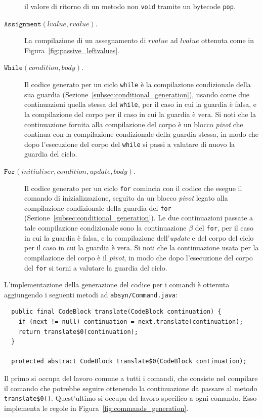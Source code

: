 \begin{description}
  il valore di ritorno di un metodo non \texttt{void} tramite un
  bytecode \texttt{pop}.
\item[\underline{$\mathtt{Assignment(\mathit{lvalue},\mathit{rvalue})}$}.]
  La compilazione di un assegnamento di $\mathit{rvalue}$ ad
  $\mathit{lvalue}$ \e ottenuta come in Figura~\ref{fig:passive_leftvalues}.
\item[\underline{$\mathtt{While(\mathit{condition},\mathit{body})}$}.]
  Il codice generato per un ciclo \texttt{while} \`e la compilazione
  condizionale della sua guardia (Sezione~\ref{subsec:conditional_generation}),
  usando come due continuazioni quella stessa del \texttt{while}, per
  il caso in cui la guardia \`e falsa, e la compilazione del
  corpo per il caso in cui la guardia \`e vera. Si noti che la
  continuazione fornita alla compilazione del corpo \`e un blocco
  \textit{pivot}
  che continua con la compilazione condizionale della guardia stessa,
  in modo che dopo l'esecuzione del corpo del \texttt{while} si passi
  a valutare di nuovo la guardia del ciclo.
\item[\underline{$\mathtt{For(\mathit{initialiser},\mathit{condition},
  \mathit{update},\mathit{body})}$}.]
  Il codice generato per un ciclo \texttt{for} comincia con il codice
  che esegue il comando di inizializzazione, seguito da un blocco
  \textit{pivot} legato alla compilazione condizionale della guardia
  del \texttt{for} (Sezione~\ref{subsec:conditional_generation}).
  Le due continuazioni passate a tale compilazione condizionale sono
  la continuazione $\beta$ del \texttt{for}, per il caso in cui la
  guardia \`e falsa, e la compilazione dell'\textit{update} e del corpo
  del ciclo per il caso in cui la guardia \`e vera. Si noti che la
  continuazione usata per la compilazione del corpo \`e il \textit{pivot},
  in modo che dopo l'esecuzione del corpo del \texttt{for} si torni a valutare
  la guardia del ciclo.
\end{description}

L'implementazione della generazione del codice per i comandi \`e ottenuta
aggiungendo i seguenti metodi ad \texttt{absyn/Command.java}:
%
\begin{verbatim}
  public final CodeBlock translate(CodeBlock continuation) {
    if (next != null) continuation = next.translate(continuation);
    return translate$0(continuation);
  }

  protected abstract CodeBlock translate$0(CodeBlock continuation);
\end{verbatim}
%
Il primo si occupa del lavoro comune a tutti i comandi, che consiste
nel compilare il comando che potrebbe seguire ottenendo la continuazione
da passare al metodo \texttt{translate\$0()}.
Quest'ultimo si occupa del lavoro specifico a ogni comando.
Esso implementa le regole in Figura~\ref{fig:commands_generation}.

